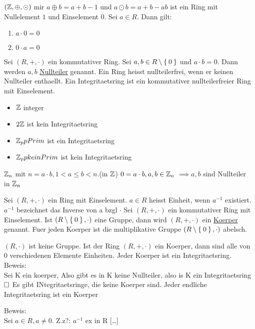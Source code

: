 \documentclass{../tudscript}
\begin{document}
$(\mathbb{Z}, \oplus, \odot)$ mir $a \oplus b = a + b -1$ und $a \odot b = a + b - ab$
ist ein Ring mit Nullelement $1$ und Einselement $0$.
Sei $a \in R$. Dann gilt:
\begin{enumerate}
\item $a \cdot 0 = 0$
\item $0 \cdot a = 0$
\end{enumerate}
Sei $(R, +, \cdot)$ ein kommutativer Ring. Sei $a, b \in R \setminus \Set{0}$ und $a \cdot b = 0$.
Dann werden $a, b$ \underline{Nullteiler} genannt.
Ein Ring heisst nullteilerfrei, wenn er keinen Nullteiler enthaellt.
Ein Integritaetsring ist ein kommutativer nullteilerfreier Ring mit Einselement.
\begin{itemize}
\item $\mathbb{Z}$ integer
\item $2\mathbb{Z}$ ist kein Integritaetsring
\item $\mathbb{Z}_p p Prim$ ist ein Integritaetsring
\item $\mathbb{Z}_p p kein Prim$ ist kein Integritaetsring
\end{itemize}
  $\mathbb{Z}_n$ mit $n = a \cdot b, 1 < a \leq b < n$.(in $\mathbb{Z}$) 
  $0 = a \cdot b, a, b \in \mathbb{Z}_n$
  $\implies a, b $ sind Nullteiler in $\mathbb{Z}_n$

  Sei $(R, +, \cdot)$ ein Ring mit Einselement. $a \in R$ heisst Einheit, wenn $a^{-1}$ existiert.
  $a^{-1}$ bezeichnet das Inverse von a bzgl $\cdot$
  Sei $(R, +, \cdot)$ ein kommutativer Ring mit Einselement. Ist $(R \setminus \Set{0}, \cdot)$ eine Gruppe, dann wird $(R, +, \cdot)$ ein \underline{Koerper} genannt.
  Fuer jeden Koerper ist die multiplikative Gruppe $(R \setminus \Set{0}, \cdot)$ abelsch.

  $(R, \cdot)$ ist keine Gruppe.
  Ist der Ring $(R, +, \cdot)$ ein Koerper, dann sind alle von 0 verschiedenen Elemente Einheiten.
  Jeder Koerper ist ein Integritaetsring.
  Beweis:\\
  Sei K ein koerper,
  Also gibt es in K keine Nullteiler, also is K ein Integritaetsring$\hfill\square$
  Es gibt INtegritaetsringe, die keine Koerper sind.
  Jeder endliche Integritaetsring ist ein Koerper

  Beweis:\\
  Sei $a \in R, a \neq 0$. Z.z?: $a^{-1}$ ex in R
  [\ldots]
  
\end{document}
